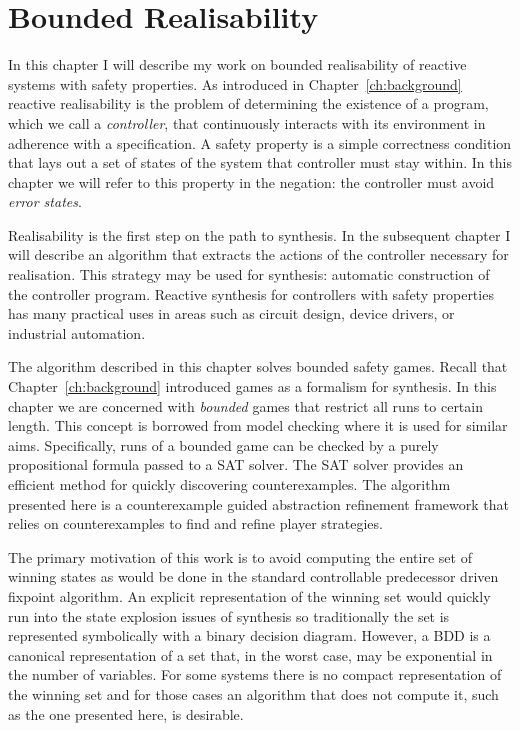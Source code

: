 \chapter{Bounded Realisability}
\label{ch:bounded}

\newtheorem*{exmp}{Example}
\newtheorem*{exmpI}{Example: Intuition behind the algorithm}

In this chapter I will describe my work on bounded realisability of reactive systems with safety properties. As introduced in Chapter~\ref{ch:background} reactive realisability is the problem of determining the existence of a program, which we call a \emph{controller}, that continuously interacts with its environment in adherence with a specification. A safety property is a simple correctness condition that lays out a set of states of the system that controller must stay within. In this chapter we will refer to this property in the negation: the controller must avoid \emph{error states}.

Realisability is the first step on the path to synthesis. In the subsequent chapter I will describe an algorithm that extracts the actions of the controller necessary for realisation. This strategy may be used for synthesis: automatic construction of the controller program. Reactive synthesis for controllers with safety properties has many practical uses in areas such as circuit design, device drivers, or industrial automation.

The algorithm described in this chapter solves bounded safety games. Recall that Chapter~\ref{ch:background} introduced games as a formalism for synthesis. In this chapter we are concerned with \emph{bounded} games that restrict all runs to certain length. This concept is borrowed from model checking where it is used for similar aims. Specifically, runs of a bounded game can be checked by a purely propositional formula passed to a SAT solver. The SAT solver provides an efficient method for quickly discovering counterexamples. The algorithm presented here is a counterexample guided abstraction refinement framework that relies on counterexamples to find and refine player strategies.

The primary motivation of this work is to avoid computing the entire set of winning states as would be done in the standard controllable predecessor driven fixpoint algorithm. An explicit representation of the winning set would quickly run into the state explosion issues of synthesis so traditionally the set is represented symbolically with a binary decision diagram. However, a BDD is a canonical representation of a set that, in the worst case, may be exponential in the number of variables. For some systems there is no compact representation of the winning set and for those cases an algorithm that does not compute it, such as the one presented here, is desirable.

